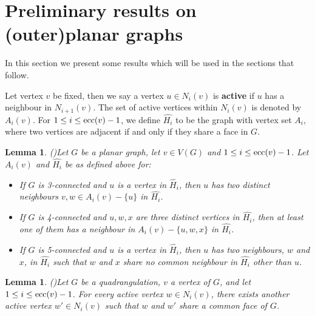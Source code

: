 \documentclass[a4paper,11pt]{article}
\newtheorem{lemma}[theorem]%
{Lemma}
\begin{document}
\section{Preliminary results on (outer)planar graphs}
\label{section:preliminaries-on-(outer-)planar}

In this section we present some results which will be used in the sections that follow.


Let vertex $v$ be fixed, then we say a vertex $u \in N_i(v)$ is \textbf{active} if $u$ has a neighbour in $N_{i+1}(v)$. The set of active vertices within $N_i(v)$ is denoted by $A_i(v)$. For \( 1 \leq i \leq {\rm ecc}(v) - 1 \), we define \( \hat{H_i} \) to be the graph with vertex set \( A_i \), where two vertices are adjacent if and only if they share a face in \( G \).

\begin{lemma}(\cite{AliDanMuk2012})\label{la:active-vertices-planar}
Let \( G \) be a planar graph, let $v \in V(G)$ and  $1 \leq i \leq {\rm ecc}(v) - 1$. 
Let \( A_i(v) \) and $\hat{H_i}$ be as defined above for:
\begin{itemize}
    \item[(a)] If \( G \) is 3-connected and \( u \) is a vertex in \( \hat{H_i} \), then \( u \) 
    has two distinct neighbours \( v, w \in A_i(v) - \{u\} \) in \( \hat{H_i} \).
    \item[(b)] If \( G \) is 4-connected and \( u, w, x \) are three distinct vertices in 
    \( \hat{H_i} \), then at least one of them has a neighbour in \( A_i(v) - \{u, w, x\} \) 
    in \( \hat{H_i} \).
    \item[(c)] If \( G \) is 5-connected and \( u \) is a vertex in \( \hat{H_i} \), then \( u \) has two neighbours, \( w \) and \( x \), in \( \hat{H_i} \) such that \( w \) and \( x \) share no common neighbour in \( \hat{H_i} \) other than \( u \).
\end{itemize}
\end{lemma}


\begin{lemma}(\cite{CzaDanOlsSze2022})\label{la:active-vertices-quadrangulation}
Let \( G \) be a quadrangulation, \( v \) a vertex of \( G \), and let 
\( 1 \leq i \leq {\rm ecc}(v) - 1 \). For every active vertex \( w \in N_i(v) \), there exists 
another active vertex \( w' \in N_i(v) \) such that \( w \) and \( w' \) share a common face of 
\( G \).
\end{lemma}
\end{document}
